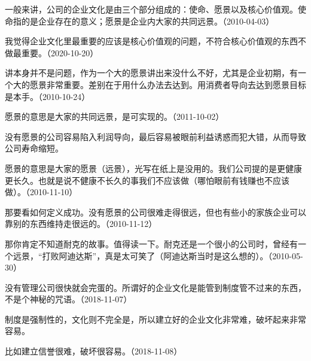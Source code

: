 一般来讲，公司的企业文化是由三个部分组成的：使命、愿景以及核心价值观。使命指的是企业存在的意义；愿景是企业内大家的共同远景。（2010-04-03）

我觉得企业文化里最重要的应该是核心价值观的问题，不符合核心价值观的东西不做最重要。（2020-10-20）


讲本身并不是问题，作为一个大的愿景讲出来没什么不好，尤其是企业初期，有一个大的愿景非常重要。差别在于用什么办法去达到。用消费者导向去达到愿景目标是本手。（2010-10-24）

愿景的意思是大家的共同远景，是可实现的。（2011-10-02）

没有愿景的公司容易陷入利润导向，最后容易被眼前利益诱惑而犯大错，从而导致公司寿命缩短。


愿景的意思是大家的愿景（远景），光写在纸上是没用的。我们公司提的是更健康更长久。也就是说不健康不长久的事我们不应该做（哪怕眼前有钱赚也不应该做）。（2010-11-10）


那要看如何定义成功。没有愿景的公司很难走得很远，但也有些小的家族企业可以靠别的东西维持走很远的。（2010-11-12）


那你肯定不知道耐克的故事。值得读一下。耐克还是一个很小的公司时，曾经有一个远景，“打败阿迪达斯”，真是太可笑了（阿迪达斯当时是这么想的）。（2010-05-30）


没有管理公司很快就会完蛋的。所谓好的企业文化是能管到制度管不过来的东西，不是个神秘的咒语。（2018-11-07）

制度是强制性的，文化则不完全是，所以建立好的企业文化非常难，破坏起来非常容易。


比如建立信誉很难，破坏很容易。（2018-11-08）


